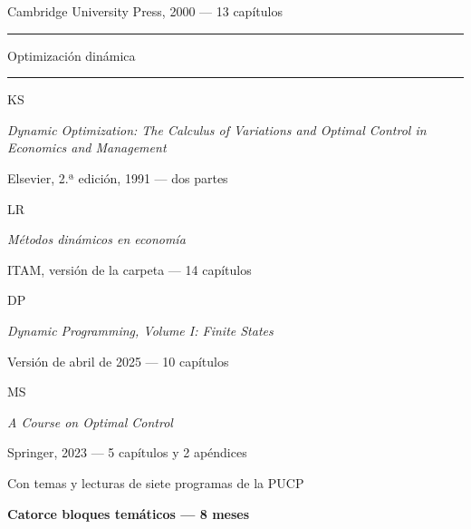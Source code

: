 \documentclass[11pt,a4paper]{article}
\newcommand{\etiqueta}[2]{%
  {\setlength{\fboxsep}{1.4pt}\colorbox{#1}{\sffamily\bfseries\color{white}\strut#2}}}
\begin{document}
\begin{titlepage}
{\small\color{tonoPizarra} Cambridge University Press, 2000 --- 13 capítulos\par}
\vspace{0.6cm}
{\sffamily\large\bfseries\color{tonoPrincipal}\textcolor{tonoClaro}{\rule[0.5ex]{1.5cm}{0.6pt}}\quad Optimización dinámica\quad\textcolor{tonoClaro}{\rule[0.5ex]{1.5cm}{0.6pt}}\par}
\vspace{0.3cm}
{\large\etiqueta{colorKS}{KS} \par}
{\normalsize \emph{\color{colorKS}Dynamic Optimization: The Calculus of Variations and Optimal Control in Economics and Management}\par}
{\small\color{tonoPizarra} Elsevier, 2.ª edición, 1991 --- dos partes\par}
\vspace{0.2cm}
{\large\etiqueta{colorLR}{LR} \par}
{\normalsize \emph{\color{colorLR}Métodos dinámicos en economía}\par}
{\small\color{tonoPizarra} ITAM, versión de la carpeta --- 14 capítulos\par}
\vspace{0.2cm}
{\large\etiqueta{colorDP}{DP} \par}
{\normalsize \emph{\color{colorDP}Dynamic Programming, Volume I: Finite States}\par}
{\small\color{tonoPizarra} Versión de abril de 2025 --- 10 capítulos\par}
\vspace{0.2cm}
{\large\etiqueta{colorMS}{MS} \par}
{\normalsize \emph{\color{colorMS}A Course on Optimal Control}\par}
{\small\color{tonoPizarra} Springer, 2023 --- 5 capítulos y 2 apéndices\par}
\vspace{0.5cm}
{\normalsize\color{colorPUCP} Con temas y lecturas de siete programas de la PUCP\par}
\vfill
{\setlength{\fboxsep}{6pt}\colorbox{tonoPrincipal}{\normalsize\sffamily\bfseries\color{white} Catorce bloques temáticos --- 8 meses}\par}
\vspace{0.2cm}
\end{titlepage}
\end{document}
